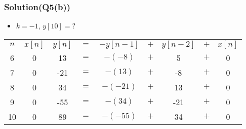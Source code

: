 \documentclass{beamer}
\begin{document}
\begin{frame}
\frametitle{Solution(Q5(b))}

\begin{itemize} \itemsep1pt \parskip0pt 
  \item[] $k=-1$, $y[10]=?$
\end{itemize}

\begin{table}
\def\arraystretch{1.5}
\begin{tabular}{ccccccccc}
\hline
$n$ & $x[n]$ & $y[n]$ & $=$ & $-y[n-1]$ & $+$ & $y[n-2]$ & $+$ & $x[n]$ \\

6 & 0 & 13 & $=$ & $-(-8)$ & $+$ & 5 & $+$ & 0 \\ 

7 & 0 & -21 & $=$ & $-(13)$ & $+$ & -8 & $+$ & 0 \\ 

8 & 0 & 34 & $=$ & $-(-21)$ & $+$ & 13 & $+$ & 0 \\ 

9 & 0 & -55 & $=$ & $-(34)$ & $+$ & -21 & $+$ & 0 \\ 

10 & 0 & 89 & $=$ & $-(-55)$ & $+$ & 34 & $+$ & 0 \\

\hline
\end{tabular}
\end{table}

\end{frame}

\end{document}
